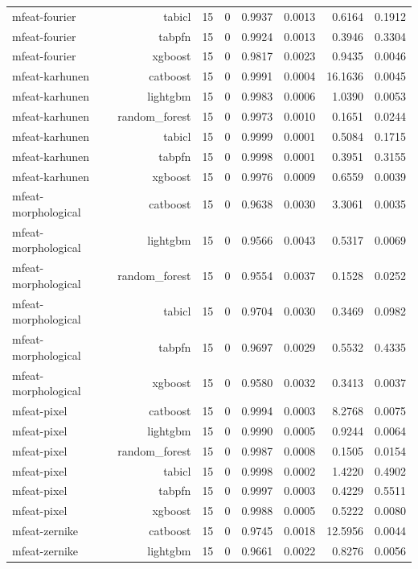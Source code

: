 \begin{table}[htbp]
\begin{tabular}{lrrrrrrr}
mfeat-fourier & tabicl & 15 & 0 & 0.9937 & 0.0013 & 0.6164 & 0.1912 \\
mfeat-fourier & tabpfn & 15 & 0 & 0.9924 & 0.0013 & 0.3946 & 0.3304 \\
mfeat-fourier & xgboost & 15 & 0 & 0.9817 & 0.0023 & 0.9435 & 0.0046 \\
mfeat-karhunen & catboost & 15 & 0 & 0.9991 & 0.0004 & 16.1636 & 0.0045 \\
mfeat-karhunen & lightgbm & 15 & 0 & 0.9983 & 0.0006 & 1.0390 & 0.0053 \\
mfeat-karhunen & random\_forest & 15 & 0 & 0.9973 & 0.0010 & 0.1651 & 0.0244 \\
mfeat-karhunen & tabicl & 15 & 0 & 0.9999 & 0.0001 & 0.5084 & 0.1715 \\
mfeat-karhunen & tabpfn & 15 & 0 & 0.9998 & 0.0001 & 0.3951 & 0.3155 \\
mfeat-karhunen & xgboost & 15 & 0 & 0.9976 & 0.0009 & 0.6559 & 0.0039 \\
mfeat-morphological & catboost & 15 & 0 & 0.9638 & 0.0030 & 3.3061 & 0.0035 \\
mfeat-morphological & lightgbm & 15 & 0 & 0.9566 & 0.0043 & 0.5317 & 0.0069 \\
mfeat-morphological & random\_forest & 15 & 0 & 0.9554 & 0.0037 & 0.1528 & 0.0252 \\
mfeat-morphological & tabicl & 15 & 0 & 0.9704 & 0.0030 & 0.3469 & 0.0982 \\
mfeat-morphological & tabpfn & 15 & 0 & 0.9697 & 0.0029 & 0.5532 & 0.4335 \\
mfeat-morphological & xgboost & 15 & 0 & 0.9580 & 0.0032 & 0.3413 & 0.0037 \\
mfeat-pixel & catboost & 15 & 0 & 0.9994 & 0.0003 & 8.2768 & 0.0075 \\
mfeat-pixel & lightgbm & 15 & 0 & 0.9990 & 0.0005 & 0.9244 & 0.0064 \\
mfeat-pixel & random\_forest & 15 & 0 & 0.9987 & 0.0008 & 0.1505 & 0.0154 \\
mfeat-pixel & tabicl & 15 & 0 & 0.9998 & 0.0002 & 1.4220 & 0.4902 \\
mfeat-pixel & tabpfn & 15 & 0 & 0.9997 & 0.0003 & 0.4229 & 0.5511 \\
mfeat-pixel & xgboost & 15 & 0 & 0.9988 & 0.0005 & 0.5222 & 0.0080 \\
mfeat-zernike & catboost & 15 & 0 & 0.9745 & 0.0018 & 12.5956 & 0.0044 \\
mfeat-zernike & lightgbm & 15 & 0 & 0.9661 & 0.0022 & 0.8276 & 0.0056 \\

\end{tabular}
\end{table}
